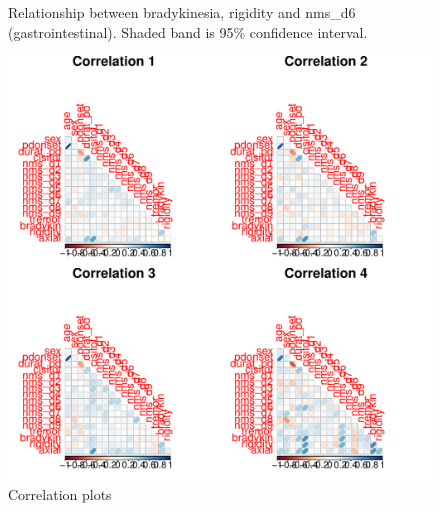 \documentclass[10pt]{article}
\begin{document}
\begin{figure}[h]
  \centering

  \caption{Relationship between \protect{} bradykinesia,
  \protect{} rigidity and nms\_d6 (gastrointestinal). Shaded band
is 95\% confidence interval.}
  \label{fig:corrxy-d6}
\end{figure}
\begin{figure}[h]
  \centering
  \includegraphics[width=0.68\linewidth]{corrplots.pdf}
  \caption{Correlation plots}
  \label{fig:corrplots}
\end{figure}
\end{document}

